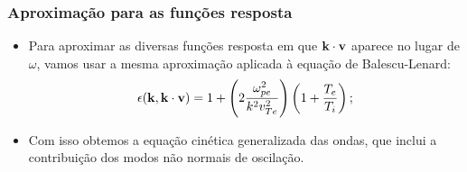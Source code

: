 \documentclass[10pt,aspectratio=1610,lualatex]{beamer}
\begin{document}
\begin{frame}
  \frametitle{Aproximação para as funções resposta}
  \begin{itemize}
    \item Para aproximar as diversas funções resposta em que
    ${\bf k\cdot v}$ aparece no lugar de $\omega$, vamos usar
    a mesma aproximação aplicada à  equação de Balescu-Lenard:
    \begin{equation*}
      \epsilon({\bf k},{\bf k \cdot v})
      = 1+\left( 2 \frac{\omega_{pe}^2}{k^2v_{Te}^2} \right)
      \left( 1+\frac{T_e}{T_i} \right);
    \end{equation*}
    \pause
    \item Com isso obtemos a equação cinética generalizada das
    ondas, que inclui a contribuição dos modos não normais de
    oscilação.
  \end{itemize}
\end{frame}
\end{document}
